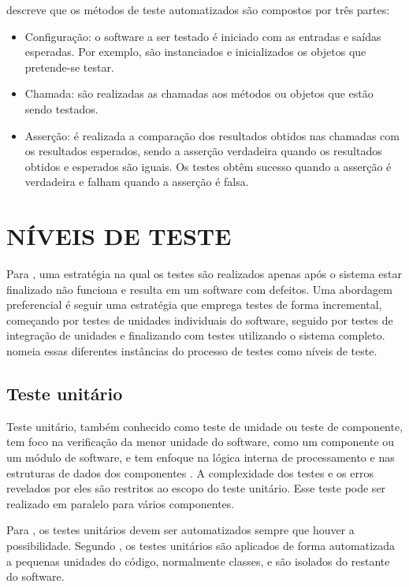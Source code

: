      descreve que os métodos de teste automatizados são compostos por três partes:

    \begin{itemize}
        \item Configuração: o software a ser testado é iniciado com as entradas e saídas esperadas. Por exemplo, são instanciados e inicializados os objetos que pretende-se testar.
        \item Chamada: são realizadas as chamadas aos métodos ou objetos que estão sendo testados.
        \item Asserção: é realizada a comparação dos resultados obtidos nas chamadas com os resultados esperados, sendo a asserção verdadeira quando os resultados obtidos e esperados são iguais. Os testes obtêm sucesso quando a asserção é verdadeira e falham quando a asserção é falsa.
    \end{itemize}


    \section{NÍVEIS DE TESTE}
    \label{section:niveis-de-teste}

    Para , uma estratégia na qual os testes são realizados apenas após o sistema estar finalizado não funciona e resulta em um software com defeitos. Uma abordagem preferencial é seguir uma estratégia que emprega testes de forma incremental, começando por testes de unidades individuais do software, seguido por testes de integração de unidades e finalizando com testes utilizando o sistema completo.  nomeia essas diferentes instâncias do processo de testes como níveis de teste.

        \subsection{Teste unitário}
        
        Teste unitário, também conhecido como teste de unidade ou teste de componente, tem foco na verificação da menor unidade do software, como um componente ou um módulo de software, e tem enfoque na lógica interna de processamento e nas estruturas de dados dos componentes \cite{Pressman2015}. A complexidade dos testes e os erros revelados por eles são restritos ao escopo do teste unitário. Esse teste pode ser realizado em paralelo para vários componentes.

        Para , os testes unitários devem ser automatizados sempre que houver a possibilidade. Segundo , os testes unitários são aplicados de forma automatizada a pequenas unidades do código, normalmente classes, e são isolados do restante do software.

